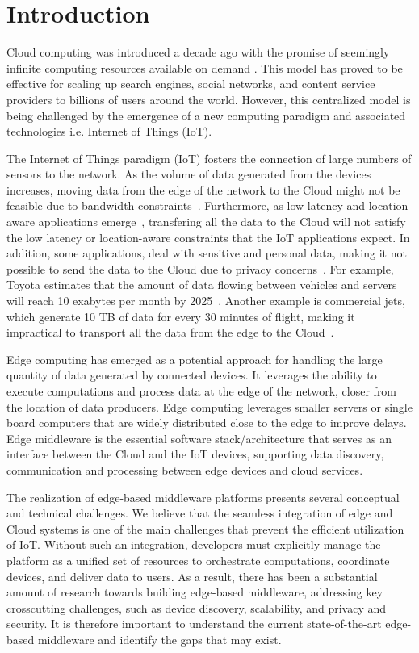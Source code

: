 \section{Introduction}
Cloud computing was introduced a decade ago with the promise of seemingly infinite computing resources available on demand \cite{Armbrust09abovethe}. This model has proved to be effective for scaling up search engines\cite{7073834}, social networks\cite{6596496}, and content service providers\cite{6915771} to billions of users around the world. However, this centralized model is being challenged by the emergence of a new computing paradigm and associated technologies i.e. Internet of Things (IoT).

The Internet of Things paradigm (IoT) fosters the connection of large numbers of sensors to the network. As the volume of data generated from the devices increases, moving data from the edge of the network to the Cloud might not be feasible due to bandwidth constraints~\cite{8289317}. Furthermore, as low latency and location-aware applications emerge~\cite{7389122}, transfering all the data to the Cloud will not satisfy the low latency or location-aware constraints that the IoT applications expect. In addition, some applications, deal with sensitive and personal data, making it not possible to send the data to the Cloud due to privacy concerns~\cite{7849185}. For example, Toyota estimates that the amount of data flowing between vehicles and servers will reach 10 exabytes per month by 2025~\cite{Toyota}. Another example is commercial jets, which generate 10 TB of data for every 30 minutes of flight, making it impractical to transport all the data from the edge to the Cloud~\cite{ciscoJet}. 

Edge computing has emerged as a potential approach for handling the large quantity of data generated by connected devices. It leverages the ability to execute computations and process data at the edge of the network, closer from the location of data producers. Edge computing leverages smaller servers or single board computers that are widely distributed close to the edge to improve delays. Edge middleware is the essential software stack/architecture that serves as an interface between the Cloud and the IoT devices, supporting data discovery, communication and processing between edge devices and cloud services. %

The realization of edge-based middleware platforms presents several conceptual and technical challenges. We believe that the seamless integration of edge and Cloud systems is one of the main challenges that prevent the efficient utilization of IoT. Without such an integration, developers must explicitly manage the platform as a unified set of resources to orchestrate computations, coordinate devices, and deliver data to users. As a result, there has been a substantial amount of research towards building edge-based middleware, addressing key crosscutting challenges, such as device discovery, scalability, and privacy and security. It is therefore important to understand the current state-of-the-art edge-based middleware and identify the gaps that may exist.

